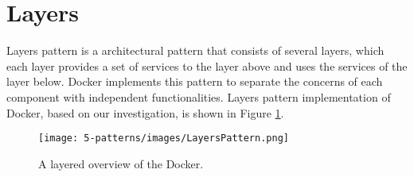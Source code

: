 \section{Layers}
\label{sec:layers-pattern}
Layers pattern is a architectural pattern that consists of several layers, which
each layer provides a set of services to the layer above and uses the services
of the layer below. Docker implements this pattern to separate the concerns of
each component with independent functionalities. Layers pattern implementation
of Docker, based on our investigation, is shown in Figure \ref{fig:layers-pattern}.

\begin{figure}[H]
\centering
\texttt{[image: 5-patterns/images/LayersPattern.png]}
\caption{A layered overview of the Docker.}
\label{fig:layers-pattern}
\end{figure}

